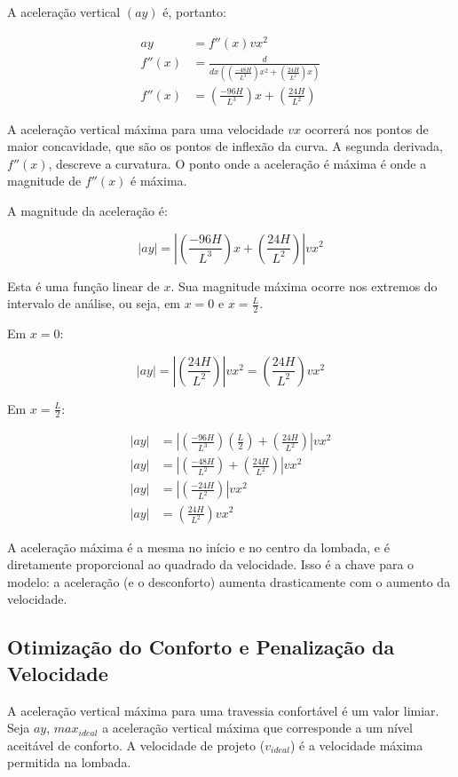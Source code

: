 \documentclass[../resumo.tex]{subfiles}
\begin{document}
	A aceleração vertical $(ay)$ é, portanto:

	\begin{align*}
		ay &= f''(x)vx^2 \\
		f''(x) &= \frac{d}{dx((\frac{-48H}{L^3})x^2 + (\frac{24H}{L^2})x)} \\
		f''(x) &= (\frac{-96H}{L^3})x + (\frac{24H}{L^2})
	\end{align*}

	A aceleração vertical máxima para uma velocidade $vx$ ocorrerá nos pontos de maior concavidade,
	que são os pontos de inflexão da curva. A segunda derivada, $f''(x)$, descreve a curvatura.
	O ponto onde a aceleração é máxima é onde a magnitude de $f''(x)$ é máxima.
	
	A magnitude da aceleração é:

	\[ |ay| = |(\frac{-96H}{L^3})x + (\frac{24H}{L^2})|vx^2 \]

	Esta é uma função linear de $x$. Sua magnitude máxima ocorre nos extremos do intervalo de análise,
	ou seja, em $x = 0$ e $x = \frac{L}{2}$.

	Em $x = 0$:

	\[ |ay| = |(\frac{24H}{L^2})|vx^2 = (\frac{24H}{L^2})vx^2 \]

	Em $x = \frac{L}{2}$:

	\begin{align*}
		|ay| &= |(\frac{-96H}{L^3})(\frac{L}{2})+(\frac{24H}{L^2})|vx^2 \\
		|ay| &= |(\frac{-48H}{L^2})+(\frac{24H}{L^2})|vx^2 \\
		|ay| &= |(\frac{-24H}{L^2})|vx^2 \\
		|ay| &= (\frac{24H}{L^2})vx^2
	\end{align*}

	A aceleração máxima é a mesma no início e no centro da lombada, e é diretamente proporcional
	ao quadrado da velocidade. Isso é a chave para o modelo: a aceleração (e o desconforto) aumenta
	drasticamente com o aumento da velocidade.

	\subsection{Otimização do Conforto e Penalização da Velocidade}

	A aceleração vertical máxima para uma travessia confortável é um valor limiar. Seja $ay$, $max_{ideal}$
	a aceleração vertical máxima que corresponde a um nível aceitável de conforto. A velocidade de projeto
	($v_{ideal}$) é a velocidade máxima permitida na lombada.
\end{document}

